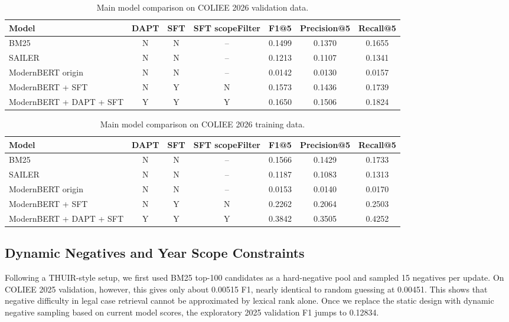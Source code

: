 \begin{table}[t]
  \centering
  \scriptsize
  \begin{tabular}{lcccccc}
    \toprule
    Model & DAPT & SFT & SFT scopeFilter & F1@5 & Precision@5 & Recall@5 \\
    \midrule
    BM25 & N & N & -- & 0.1499 & 0.1370 & 0.1655 \\
    SAILER & N & N & -- & 0.1213 & 0.1107 & 0.1341 \\
    ModernBERT origin & N & N & -- & 0.0142 & 0.0130 & 0.0157 \\
    ModernBERT + SFT & N & Y & N & 0.1573 & 0.1436 & 0.1739 \\
    ModernBERT + DAPT + SFT & Y & Y & Y & 0.1650 & 0.1506 & 0.1824 \\
    \bottomrule
  \end{tabular}
  \caption{Main model comparison on COLIEE 2026 validation data.}
  \label{tab:main-results-valid}
\end{table}

\begin{table}[t]
  \centering
  \scriptsize
  \begin{tabular}{lcccccc}
    \toprule
    Model & DAPT & SFT & SFT scopeFilter & F1@5 & Precision@5 & Recall@5 \\
    \midrule
    BM25 & N & N & -- & 0.1566 & 0.1429 & 0.1733 \\
    SAILER & N & N & -- & 0.1187 & 0.1083 & 0.1313 \\
    ModernBERT origin & N & N & -- & 0.0153 & 0.0140 & 0.0170 \\
    ModernBERT + SFT & N & Y & N & 0.2262 & 0.2064 & 0.2503 \\
    ModernBERT + DAPT + SFT & Y & Y & Y & 0.3842 & 0.3505 & 0.4252 \\
    \bottomrule
  \end{tabular}
  \caption{Main model comparison on COLIEE 2026 training data.}
  \label{tab:main-results-train}
\end{table}

\subsection{Dynamic Negatives and Year Scope Constraints}

Following a THUIR-style setup, we first used BM25 top-100 candidates as a hard-negative pool and sampled 15 negatives per update. On COLIEE 2025 validation, however, this gives only about 0.00515 F1, nearly identical to random guessing at 0.00451. This shows that negative difficulty in legal case retrieval cannot be approximated by lexical rank alone. Once we replace the static design with dynamic negative sampling based on current model scores, the exploratory 2025 validation F1 jumps to 0.12834.

